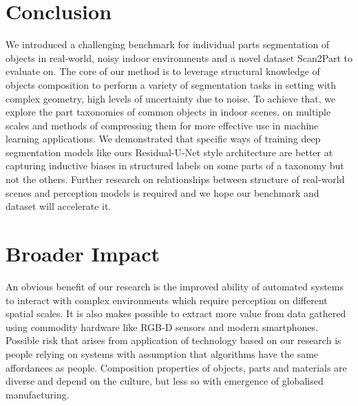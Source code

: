 \section{Conclusion}
We introduced a challenging benchmark for individual parts segmentation of objects in real-world, noisy indoor environments and a novel dataset Scan2Part to evaluate on. 
The core of our method is to leverage structural knowledge of objects composition to perform a variety of segmentation tasks in setting with complex geometry, high levels of uncertainty due to noise. To achieve that, we explore the part taxonomies of common objects in indoor scenes, on multiple scales and methods of compressing them for more effective use in machine learning applications. We demonstrated that specific ways of training deep segmentation models like ours Residual-U-Net style architecture are better at capturing inductive biases in structured labels on some parts of a taxonomy but not the others. Further research on relationships between structure of real-world scenes and perception models is required and we hope our benchmark and dataset will accelerate it.  


\section*{Broader Impact}
An obvious benefit of our research is the improved ability of automated systems to interact with complex environments which require perception on different spatial scales. It is also makes possible to extract more value from data gathered using commodity hardware like RGB-D sensors and modern smartphones. Possible risk that arises from application of technology based on our research is people relying on systems with assumption that algorithms have the same affordances as people.
Composition properties of objects, parts and materials are diverse and depend on the culture, but less so with emergence of globalised manufacturing.  